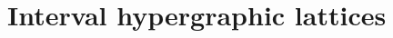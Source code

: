 \documentclass{amsart}
\theoremstyle{definition}
\newcommand{\cal}[1]{\mathcal{#1}} %
\newcommand{\ssm}{\smallsetminus} %
\newcommand{\II}{\mathbb I} %
\newcommand{\cX}{\cal{X}}
\newcommand{\cY}{\cal{Y}}
\newcommand{\flip}[4]{\ensuremath{#1 \, \begin{tikzpicture}[scale=1,baseline=-.1cm] \path[->]  (0,0) edge node[fill=white,inner sep=2pt, font=\tiny ] {$#2#3$} (.7,0); \end{tikzpicture} \, #4}}
\begin{document}
%


\section{Interval hypergraphic lattices}
\label{sec:LatticeI}
\end{document}
